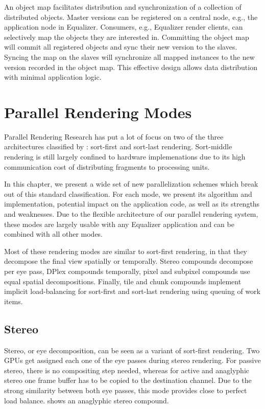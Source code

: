 An object map facilitates distribution and synchronization of a collection of
distributed objects. Master versions can be registered on a central node, e.g.,
the application node in \textsf{Equalizer}. Consumers, e.g., \textsf{Equalizer}
render clients, can selectively map the objects they are interested in.
Committing the object map will commit all registered objects and sync their new
version to the slaves. Syncing the map on the slaves will synchronize all mapped
instances to the new version recorded in the object map. This effective design
allows data distribution with minimal application logic.


\chapter{Parallel Rendering Modes}

Parallel Rendering Research has put a lot of focus on two of the three
architectures classified by \cite{Molnar92}: sort-first and sort-last rendering.
Sort-middle rendering is still largely confined to hardware implemenations due
to its high communication cost of distributing fragments to processing units.

In this chapter, we present a wide set of new parallelization schemes which
break out of this standard classification. For each mode, we present its
algorithm and implementation, potential impact on the application code, as well
as its strengths and weaknesses. Due to the flexible architecture of our
parallel rendering system, these modes are largely usable with any Equalizer
application and can be combined with all other modes.

Most of these rendering modes are similar to sort-first rendering, in that they
decompose the final view spatially or temporally. Stereo compounds decompose per
eye pass, DPlex compounds temporally, pixel and subpixel compounds use equal
spatial decompositions. Finally, tile and chunk compounds implement implicit
load-balancing for sort-first and sort-last rendering using queuing of work
items.

\section{Stereo}

Stereo, or eye decomposition, can be seen as a variant of sort-first rendering.
Two GPUs get assigned each one of the eye passes during stereo rendering. For
passive stereo, there is no compositing step needed, whereas for active and
anaglyphic stereo one frame buffer has to be copied to the destination channel.
Due to the strong similarity between both eye passes, this mode provides close
to perfect load balance.  shows an anaglyphic stereo compound.

